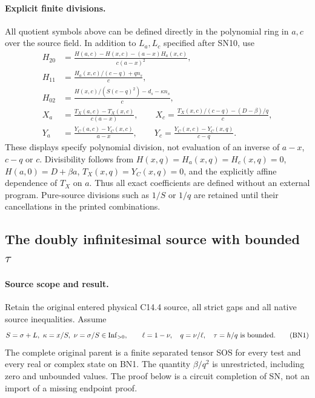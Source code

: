 \paragraph{Explicit finite divisions.}
All quotient symbols above can be defined directly in the polynomial
ring in $a,c$ over the source field.  In addition to $L_a,L_c$
specified after SN10, use
\[
\begin{aligned}
 H_{20}&=\frac{H(a,c)-H(x,c)-(a-x)H_a(x,c)}{c(a-x)^2},\\
 H_{11}&=\frac{H_a(x,c)/(c-q)+qn_s}{c},\\
 H_{02}&=\frac{H(x,c)/(S(c-q)^2)-d_s-\kappa n_s}{c},\\
 X_a&=\frac{T_X(a,c)-T_X(x,c)}{c(a-x)},\qquad
 X_c=\frac{T_X(x,c)/(c-q)-(D-\beta)/q}{c},\\
 Y_a&=\frac{Y_C(a,c)-Y_C(x,c)}{a-x},\qquad
 Y_c=\frac{Y_C(x,c)-Y_C(x,q)}{c-q}.
\end{aligned}
\]
These displays specify polynomial division, not evaluation of an
inverse of $a-x$, $c-q$ or $c$.  Divisibility follows from
$H(x,q)=H_a(x,q)=H_c(x,q)=0$, $H(a,0)=D+\beta a$,
$T_X(x,q)=Y_C(x,q)=0$, and the explicitly affine dependence of
$T_X$ on $a$.  Thus all exact coefficients are defined without an
external program.  Pure-source divisions such as $1/S$ or $1/q$
are retained until their cancellations in the printed combinations.



\subsection{The doubly infinitesimal source with bounded $\tau$}

\label{component:p80b0c5b9879f}

\label{p80b0c5b9879f:sec:new-c144-bounded-h-ratio}

\paragraph{Source scope and result.}
Retain the original entered physical C14.4 source, all strict gaps and
all native source inequalities. Assume
\[
 S=\sigma+L,\ \kappa=x/S,\ \nu=\sigma/S
       \in\operatorname{Inf}_{>0},\qquad
 \ell=1-\nu,\quad q=\nu/\ell,\quad
 \tau=h/q\ \hbox{is bounded}.
 \tag{BN1}
\]
The complete original parent is a finite separated tensor SOS for
every test and every real or complex state on BN1. The quantity
$\beta/q^2$ is unrestricted, including zero and unbounded values.
The proof below is a circuit completion of SN, not an import of
a missing endpoint proof.

